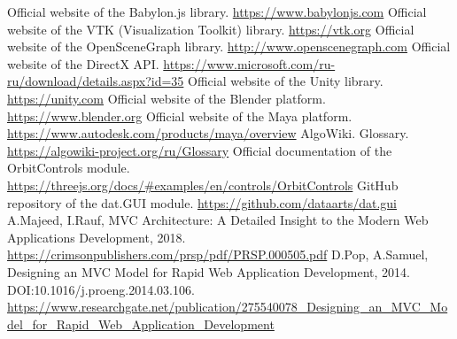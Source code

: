 \begin{thebibliography}{}
Official website of the Babylon.js library. \url{https://www.babylonjs.com}
Official website of the VTK (Visualization Toolkit) library. \url{https://vtk.org}
Official website of the OpenSceneGraph library. \url{http://www.openscenegraph.com}
Official website of the DirectX API. \url{https://www.microsoft.com/ru-ru/download/details.aspx?id=35}
Official website of the Unity library. \url{https://unity.com}
Official website of the Blender platform. \url{https://www.blender.org}
Official website of the Maya platform. \url{https://www.autodesk.com/products/maya/overview}
AlgoWiki. Glossary. \url{https://algowiki-project.org/ru/Glossary}
Official documentation of the OrbitControls module. \url{https://threejs.org/docs/\#examples/en/controls/OrbitControls}
GitHub repository of the dat.GUI module. \url{https://github.com/dataarts/dat.gui}
A.Majeed, I.Rauf, MVC Architecture: A Detailed Insight to the Modern Web Applications Development, 2018. \url{https://crimsonpublishers.com/prsp/pdf/PRSP.000505.pdf}
D.Pop, A.Samuel, Designing an MVC Model for Rapid Web Application Development, 2014. DOI:10.1016/j.proeng.2014.03.106. \url{https://www.researchgate.net/publication/275540078\_Designing\_an\_MVC\_Model\_for\_Rapid\_Web\_Application\_Development}




\end{thebibliography}
